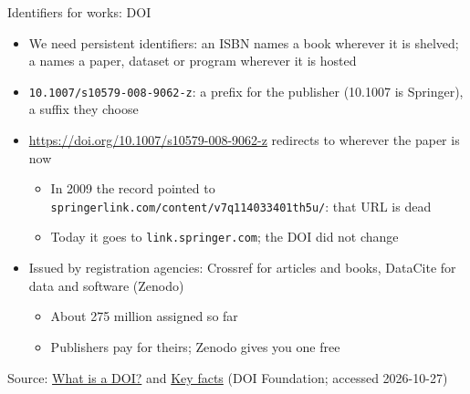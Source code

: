 \documentclass[aspectratio=169]{beamer}
\begin{document}
\begin{frame}{Identifiers for works: DOI}
\begin{itemize}
  \item We need persistent identifiers: an ISBN names a book wherever it is
    shelved; a  names a paper, dataset or
    program wherever it is hosted
  \item \texttt{10.1007/s10579-008-9062-z}: a prefix for the publisher
    (10.1007 is Springer), a suffix they choose
  \item \url{https://doi.org/10.1007/s10579-008-9062-z} redirects to wherever
    the paper is now
    \begin{itemize}
    \item In 2009 the record pointed to
      \texttt{springerlink.com/content/v7q114033401th5u/}: that URL is dead
    \item Today it goes to \texttt{link.springer.com}; the DOI did not change
    \end{itemize}
  \item Issued by registration agencies: Crossref for articles and books,
    DataCite for data and software (Zenodo)
    \begin{itemize}
    \item About 275 million assigned so far
    \item Publishers pay for theirs; Zenodo gives you one free
    \end{itemize}
\end{itemize}
\medskip
\tiny Source: \href{https://www.doi.org/the-identifier/what-is-a-doi/}{What is a DOI?}
and \href{https://www.doi.org/the-identifier/resources/factsheets/key-facts-on-digital-object-identifier-system}{Key facts} (DOI Foundation; accessed 2026-10-27)
\end{frame}
\end{document}
